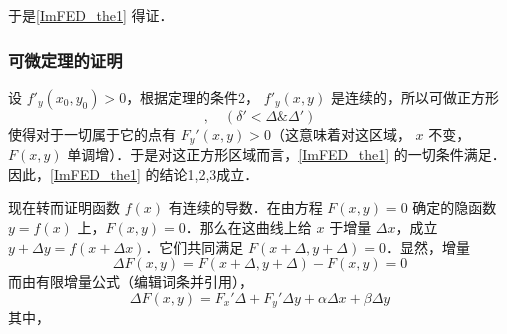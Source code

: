 于是\autoref{ImFED_the1} 得证．
\subsubsection{可微定理的证明}
设 $f'_y(x_0,y_0)>0$，根据定理的条件2， $f'_y(x,y)$ 是连续的，所以可做正方形
\begin{equation}
[x_0-\delta',x_0+\delta';y_0-\delta',y_0+\delta'],\quad(\delta'<\Delta \&\Delta') 
\end{equation}
使得对于一切属于它的点有 $F_y'(x,y)>0$（这意味着对这区域， $x$ 不变，$F(x,y)$ 单调增）．于是对这正方形区域而言，\autoref{ImFED_the1} 的一切条件满足．因此，\autoref{ImFED_the1} 的结论1,2,3成立．

现在转而证明函数 $f(x)$ 有连续的导数．在由方程 $F(x,y)=0$ 确定的隐函数 $y=f(x)$ 上，$F(x,y)=0$．那么在这曲线上给 $x$ 于增量 $\Delta x$，成立 $y+\Delta y=f(x+\Delta x)$．它们共同满足 $F(x+\Delta,y+\Delta)=0$．显然，增量
\begin{equation}
\Delta F(x,y)=F(x+\Delta,y+\Delta)-F(x,y)=0
\end{equation}
而由有限增量公式（编辑词条并引用），
\begin{equation}
\Delta F(x,y)=F_x'\Delta+F_y'\Delta y+\alpha\Delta x+\beta\Delta y
\end{equation}
其中，

